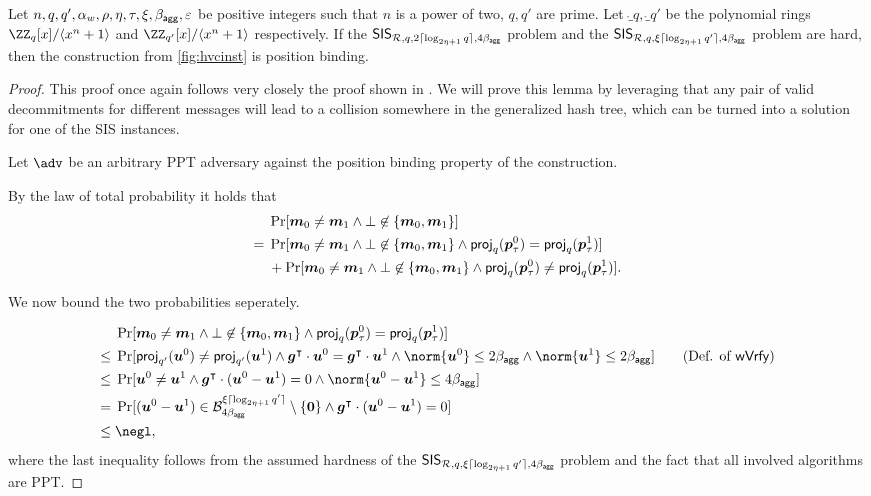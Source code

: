 \begin{lemma}\label{lem:hvcposbind}
  Let $n,q,q',\alpha_w,\rho,\eta,\tau,\xi,\beta_{\mathsf{agg}},\varepsilon$ be positive integers such that $n$ is a power of two, $q,q'$ are prime.
  Let $\ring_q,\ring_{q'}$ be the polynomial rings $\ZZ_q[x]/\langle x^n+1\rangle$ and $\ZZ_{q'}[x]/\langle x^n+1\rangle$ respectively.
  If the $\mathsf{SIS}_{\mathcal{R},q,2\lceil \log_{2\eta+1} q \rceil,4\beta_{\mathsf{agg}}}$ problem and the $\mathsf{SIS}_{\mathcal{R},q,\xi\lceil \log_{2\eta+1} q' \rceil,4\beta_{\mathsf{agg}}}$ problem are hard, then the construction from \autoref{fig:hvcinst} is position binding.
\end{lemma}
\begin{proof}
This proof once again follows very closely the proof shown in \cite{CCS:FleSimZha22}.
We will prove this lemma by leveraging that any pair of valid decommitments for different messages will lead to a collision somewhere in the generalized hash tree, which can be turned into a solution for one of the SIS instances. 

  Let $\adv$ be an arbitrary PPT adversary against the position binding property of the construction.
  
  By the law of total probability it holds that
  \begin{align*}
    &\Pr[\boldsymbol{m}_0\neq \boldsymbol{m}_1 \land \bot\not\in\{\boldsymbol{m}_0,\boldsymbol{m}_1\}]\\
    ={}& \Pr[\boldsymbol{m}_0\neq \boldsymbol{m}_1 \land \bot\not\in\{\boldsymbol{m}_0,\boldsymbol{m}_1\} \land \mathsf{proj}_q(\boldsymbol{p}_\tau^0) = \mathsf{proj}_q(\boldsymbol{p}_\tau^1)]\\& + \Pr[\boldsymbol{m}_0\neq \boldsymbol{m}_1 \land \bot\not\in\{\boldsymbol{m}_0,\boldsymbol{m}_1\} \land \mathsf{proj}_q(\boldsymbol{p}_\tau^0) \neq \mathsf{proj}_q(\boldsymbol{p}_\tau^1)].
  \end{align*}
  
  We now bound the two probabilities seperately.
  
  \begin{align*}
    &\Pr[\vec{m}_0\neq \vec{m}_1 \land \bot\not\in\{\vec{m}_0,\vec{m}_1\} \land \proj_q(\vec{p}_\tau^0) = \proj_q(\vec{p}_\tau^1)]\\
    \leq{}&\Pr[\proj_{q'}(\vec{u}^0) \neq \proj_{q'}(\vec{u}^1) \land \vec{g}^\intercal\cdot \vec{u}^0 = \vec{g}^\intercal\cdot \vec{u}^1 \land \norm{\vec{u}^0}\leq 2\bagg \land \norm{\vec{u}^1}\leq 2\bagg]\tag{Def. of $\wverify$}\\
    \leq{}& \Pr[\vec{u}^0 \neq \vec{u}^1 \land \vec{g}^\intercal\cdot (\vec{u}^0-\vec{u}^1) = 0 \land \norm{\vec{u}^0-\vec{u}^1}\leq 4\bagg]\\
    = {}& \Pr[(\vec{u}^0-\vec{u}^1) \in \ball_{4\bagg}^{\xi\lceil\log_{2\eta+1}q'\rceil}\setminus \{\vec{0}\} \land \vec{g}^\intercal\cdot (\vec{u}^0-\vec{u}^1) = 0]\\
    \leq{}& \negl,
  \end{align*}
  where the last inequality follows from the assumed hardness of the $\mathsf{SIS}_{\mathcal{R},q,\xi\lceil \log_{2\eta+1} q' \rceil,4\beta_{\mathsf{agg}}}$ problem and the fact that all involved algorithms are PPT.
  

\end{proof}
